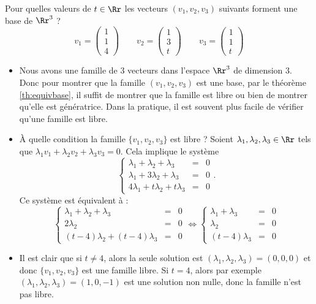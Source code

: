 \documentclass[class=report,crop=false]{standalone}
\begin{document}
\begin{exemple}
Pour quelles valeurs de $t\in\Rr$ les vecteurs $(v_1,v_2,v_3)$ suivants forment une base de $\Rr^3$ ?
$$v_1 = \begin{pmatrix}1\\1\\4\end{pmatrix} \qquad
v_2 = \begin{pmatrix}1\\3\\t\end{pmatrix} \qquad
v_3 = \begin{pmatrix}1\\1\\t\end{pmatrix}$$
\begin{itemize}
  \item Nous avons une famille de $3$ vecteurs dans l'espace $\Rr^3$ de dimension $3$.
  Donc pour montrer que la famille  $(v_1,v_2,v_3)$ est une base, par le théorème \ref{th:equivbase},
  il suffit  de montrer que la famille est libre ou bien de montrer qu'elle est génératrice.
  Dans la pratique, il est souvent plus facile de vérifier qu'une famille est libre.

  \item \`A quelle condition la famille $\{ v_1,v_2,v_3 \}$ est libre ?
  Soient $\lambda_1,\lambda_2,\lambda_3 \in \Rr$ tels que $\lambda_1 v_1 + \lambda_2 v_2 + \lambda_3 v_3 = 0$.
  Cela implique le système
  $$\left\{ \begin{array}{rcl}
  \lambda_1 + \lambda_2 + \lambda_3 &=& 0 \\
  \lambda_1 + 3 \lambda_2 + \lambda_3 &=& 0 \\
  4\lambda_1 + t\lambda_2 + t \lambda_3 &=& 0
  \end{array}  \right..$$
  Ce système est équivalent à :
  $$\left\{ \begin{array}{rcl}
  \lambda_1 + \lambda_2 + \lambda_3 &=& 0 \\
  2 \lambda_2 &=& 0 \\
  (t-4)\lambda_2 + (t-4) \lambda_3 &=& 0
  \end{array} \right.
  \iff
  \left\{ \begin{array}{rcl}
  \lambda_1 + \lambda_3 &=& 0 \\
  \lambda_2 &=& 0 \\
  (t-4) \lambda_3 &=& 0
  \end{array} \right.$$

  \item Il est clair que si $t\neq 4$, alors la seule solution est
  $(\lambda_1,\lambda_2,\lambda_3)=(0,0,0)$ et donc
  $\{ v_1,v_2,v_3 \}$ est une famille libre.
  Si $t = 4$, alors par exemple $(\lambda_1,\lambda_2,\lambda_3)=(1,0,-1)$ est une solution
  non nulle, donc la famille n'est pas libre.


\end{itemize}
\end{exemple}
\end{document}

